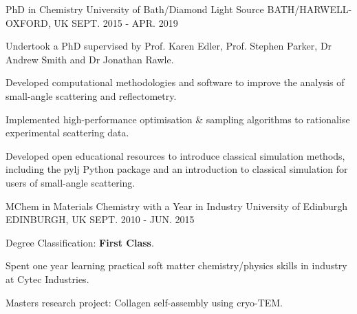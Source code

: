 \begin{cventries}
  \cventry
    {PhD in Chemistry}
    {University of Bath/Diamond Light Source}
    {BATH/HARWELL-OXFORD, UK}
    {SEPT. 2015 - APR. 2019}
    {
      \begin{cvitems}
        \item {Undertook a PhD supervised by Prof. Karen Edler, Prof. Stephen Parker, Dr Andrew Smith and Dr Jonathan Rawle.}
        \item {Developed computational methodologies and software to improve the analysis of small-angle scattering and reflectometry.}
        \item {Implemented high-performance optimisation \& sampling algorithms to rationalise experimental scattering data.}
        \item {Developed open educational resources to introduce classical simulation methods, including the pylj Python package and an introduction to classical simulation for users of small-angle scattering.}
      \end{cvitems}
    }
  \cventry
    {MChem in Materials Chemistry with a Year in Industry}
    {University of Edinburgh}
    {EDINBURGH, UK}
    {SEPT. 2010 - JUN. 2015}
    {
      \begin{cvitems}
        \item {Degree Classification: \textbf{First Class}.}
        \item {Spent one year learning practical soft matter chemistry/physics skills in industry at Cytec Industries.}
        \item {Masters research project: Collagen self-assembly using cryo-TEM.}
      \end{cvitems}
    }
\end{cventries}
